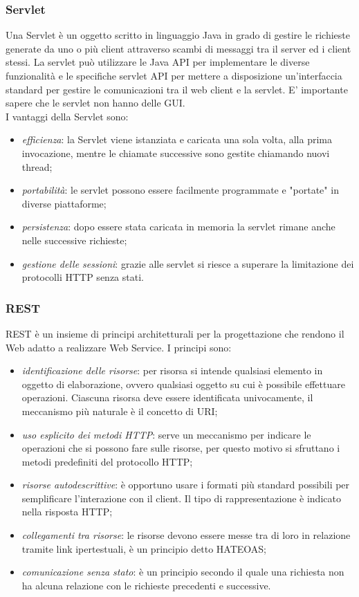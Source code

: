 \subsubsection{Servlet}
\label{subsubsec:servlet}

Una Servlet è un oggetto scritto in linguaggio Java in grado di gestire le richieste generate da uno o più client attraverso scambi di messaggi tra il server ed i client stessi. La servlet può utilizzare le Java API per implementare le diverse funzionalità e le specifiche servlet API per mettere a disposizione un'interfaccia standard per gestire le comunicazioni tra il web client e la servlet. E' importante sapere che le servlet non hanno delle GUI.\\
I vantaggi della Servlet sono:
\begin{itemize}
	\item \textit{efficienza}: la Servlet viene istanziata e caricata una sola volta, alla prima invocazione, mentre le chiamate successive sono gestite chiamando nuovi thread;
	\item \textit{portabilità}: le servlet possono essere facilmente programmate e "portate" in diverse piattaforme;
	\item \textit{persistenza}: dopo essere stata caricata in memoria la servlet rimane anche nelle successive richieste;
	\item \textit{gestione delle sessioni}: grazie alle servlet si riesce a superare la limitazione dei protocolli HTTP senza stati.
\end{itemize}

\subsubsection{REST}
\label{subsubsec:rest}

REST è un insieme di principi architetturali per la progettazione che rendono il Web adatto a realizzare Web Service. I principi sono:
\begin{itemize}
	\item \textit{identificazione delle risorse}: per risorsa si intende qualsiasi elemento in oggetto di elaborazione, ovvero qualsiasi oggetto su cui è possibile effettuare operazioni. Ciascuna risorsa deve essere identificata univocamente, il meccanismo più naturale è il concetto di URI;
	\item \textit{uso esplicito dei metodi HTTP}: serve un meccanismo per indicare le operazioni che si possono fare sulle risorse, per questo motivo si sfruttano i metodi predefiniti del protocollo HTTP;
	\item \textit{risorse autodescrittive}: è opportuno usare i formati più standard possibili per semplificare l'interazione con il client. Il tipo di rappresentazione è indicato nella risposta HTTP;
	\item \textit{collegamenti tra risorse}: le risorse devono essere messe tra di loro in relazione tramite link ipertestuali, è un principio detto HATEOAS;
	\item \textit{comunicazione senza stato}: è un principio secondo il quale una richiesta non ha alcuna relazione con le richieste precedenti e successive.
\end{itemize}

